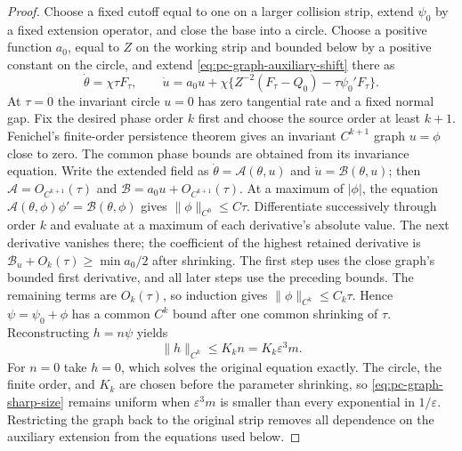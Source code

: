 \begin{proof}
Choose a fixed cutoff equal to one on a larger collision strip, extend
$\psi_0$ by a fixed extension operator, and close the base into a circle.
Choose a positive function $a_0$, equal to $Z$ on the working strip and bounded below by a positive constant on
the circle, and extend \eqref{eq:pc-graph-auxiliary-shift} there as
\[
 \dot\theta=\chi\tau F_\tau,\qquad
 \dot u=a_0u+\chi\{Z^{-2}(F_\tau-Q_0)-\tau\psi_0'F_\tau\}.
\]
At $\tau=0$ the invariant circle $u=0$ has zero tangential rate and a
fixed normal gap. Fix the desired phase order $k$ first and choose
the source order at least $k+1$. Fenichel's
finite-order persistence theorem
\cite[Theorem~3, p.~215]{Fenichel1971} gives an invariant
$C^{k+1}$ graph $u=\phi$ close to zero. The common phase bounds are
obtained from its invariance equation. Write the extended field as
$\dot\theta=\mathcal A(\theta,u)$ and
$\dot u=\mathcal B(\theta,u)$; then
$\mathcal A=O_{C^{k+1}}(\tau)$ and
$\mathcal B=a_0u+O_{C^{k+1}}(\tau)$.
At a maximum of $|\phi|$, the equation
$\mathcal A(\theta,\phi)\phi'=\mathcal B(\theta,\phi)$ gives
$\|\phi\|_{C^0}\le C\tau$. Differentiate successively through
order $k$ and evaluate at a maximum of each derivative's absolute
value. The next derivative vanishes there; the coefficient of the
highest retained derivative is
$\mathcal B_u+O_k(\tau)\ge\min a_0/2$ after shrinking. The first
step uses the close graph's bounded first derivative, and all later
steps use the preceding bounds. The remaining terms are $O_k(\tau)$,
so induction gives $\|\phi\|_{C^k}\le C_k\tau$. Hence
$\psi=\psi_0+\phi$ has a common $C^k$ bound after one common
shrinking of $\tau$. Reconstructing $h=n\psi$ yields
\begin{equation}\label{eq:pc-graph-sharp-size}
 \|h\|_{C^k}\le K_kn=K_k\varepsilon^3m.
\end{equation}
For $n=0$ take $h=0$, which solves the original equation exactly.
The circle, the finite order, and $K_k$ are chosen before the parameter
shrinking, so \eqref{eq:pc-graph-sharp-size} remains uniform when
$\varepsilon^3m$ is smaller than every exponential in
$1/\varepsilon$.  Restricting the graph back to the original strip
removes all dependence on the auxiliary extension from the equations
used below.


\end{proof}
